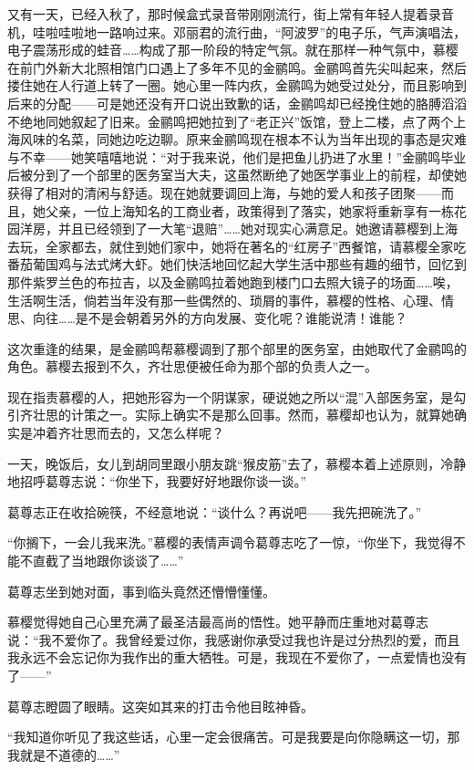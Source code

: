\par 又有一天，已经入秋了，那时候盒式录音带刚刚流行，街上常有年轻人提着录音机，哇啦哇啦地一路响过来。邓丽君的流行曲，“阿波罗”的电子乐，气声演唱法，电子震荡形成的蛙音……构成了那一阶段的特定气氛。就在那样一种气氛中，慕樱在前门外新大北照相馆门口遇上了多年不见的金鹂鸣。金鹂鸣首先尖叫起来，然后搂住她在人行道上转了一圈。她心里一阵内疚，金鹂鸣为她受过处分，而且影响到后来的分配——可是她还没有开口说出致歉的话，金鹂鸣却已经挽住她的胳膊滔滔不绝地同她叙起了旧来。金鹂鸣把她拉到了“老正兴”饭馆，登上二楼，点了两个上海风味的名菜，同她边吃边聊。原来金鹂鸣现在根本不认为当年出现的事态是灾难与不幸——她笑嘻嘻地说：“对于我来说，他们是把鱼儿扔进了水里！”金鹂鸣毕业后被分到了一个部里的医务室当大夫，这虽然断绝了她医学事业上的前程，却使她获得了相对的清闲与舒适。现在她就要调回上海，与她的爱人和孩子团聚——而且，她父亲，一位上海知名的工商业者，政策得到了落实，她家将重新享有一栋花园洋房，并且已经领到了一大笔“退赔”……她对现实心满意足。她邀请慕樱到上海去玩，全家都去，就住到她们家中，她将在著名的“红房子”西餐馆，请慕樱全家吃番茄葡国鸡与法式烤大虾。她们快活地回忆起大学生活中那些有趣的细节，回忆到那件紫罗兰色的布拉吉，以及金鹂鸣拉着她跑到楼门口去照大镜子的场面……唉，生活啊生活，倘若当年没有那一些偶然的、琐屑的事件，慕樱的性格、心理、情思、向往……是不是会朝着另外的方向发展、变化呢？谁能说清！谁能？
\par 这次重逢的结果，是金鹂鸣帮慕樱调到了那个部里的医务室，由她取代了金鹂鸣的角色。慕樱去报到不久，齐壮思便被任命为那个部的负责人之一。
\par 现在指责慕樱的人，把她形容为一个阴谋家，硬说她之所以“混”入部医务室，是勾引齐壮思的计策之一。实际上确实不是那么回事。然而，慕樱却也认为，就算她确实是冲着齐壮思而去的，又怎么样呢？
\par 一天，晚饭后，女儿到胡同里跟小朋友跳“猴皮筋”去了，慕樱本着上述原则，冷静地招呼葛尊志说：“你坐下，我要好好地跟你谈一谈。”
\par 葛尊志正在收拾碗筷，不经意地说：“谈什么？再说吧——我先把碗洗了。”
\par “你搁下，一会儿我来洗。”慕樱的表情声调令葛尊志吃了一惊，“你坐下，我觉得不能不直截了当地跟你谈谈了……”
\par 葛尊志坐到她对面，事到临头竟然还懵懵懂懂。
\par 慕樱觉得她自己心里充满了最圣洁最高尚的悟性。她平静而庄重地对葛尊志说：“我不爱你了。我曾经爱过你，我感谢你承受过我也许是过分热烈的爱，而且我永远不会忘记你为我作出的重大牺牲。可是，我现在不爱你了，一点爱情也没有了——”
\par 葛尊志瞪圆了眼睛。这突如其来的打击令他目眩神昏。
\par “我知道你听见了我这些话，心里一定会很痛苦。可是我要是向你隐瞒这一切，那我就是不道德的……”
